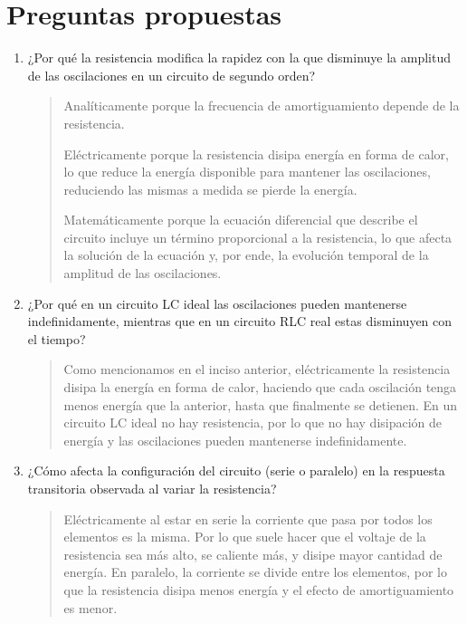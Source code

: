 \documentclass{article}
\begin{document}
    \section{Preguntas propuestas}

    \begin{enumerate}
        \item ¿Por qué la resistencia modifica la rapidez con la que disminuye la amplitud de las oscilaciones en un circuito de segundo orden?
        
        \begin{quote}
            Analíticamente porque la frecuencia de amortiguamiento depende de la resistencia. 

            Eléctricamente porque la resistencia disipa energía en forma de calor, lo que reduce la energía disponible para mantener las oscilaciones, reduciendo las mismas a medida se pierde la energía.

            Matemáticamente porque la ecuación diferencial que describe el circuito incluye un término proporcional a la resistencia, lo que afecta la solución de la ecuación y, por ende, la evolución temporal de la amplitud de las oscilaciones.
        \end{quote}

        \item ¿Por qué en un circuito LC ideal las oscilaciones pueden mantenerse indefinidamente, mientras que en un circuito RLC real estas disminuyen con el tiempo?
        
        \begin{quote}
            Como mencionamos en el inciso anterior, eléctricamente la resistencia disipa la energía en forma de calor, haciendo que cada oscilación tenga menos energía que la anterior, hasta que finalmente se detienen. En un circuito LC ideal no hay resistencia, por lo que no hay disipación de energía y las oscilaciones pueden mantenerse indefinidamente.
        \end{quote}

        \item ¿Cómo afecta la configuración del circuito (serie o paralelo) en la respuesta transitoria observada al variar la resistencia?
        
        \begin{quote}
            Eléctricamente al estar en serie la corriente que pasa por todos los elementos es la misma. Por lo que suele hacer que el voltaje de la resistencia sea más alto, se caliente más, y disipe mayor cantidad de energía. En paralelo, la corriente se divide entre los elementos, por lo que la resistencia disipa menos energía y el efecto de amortiguamiento es menor.


\end{quote}
\end{enumerate}
\end{document}
